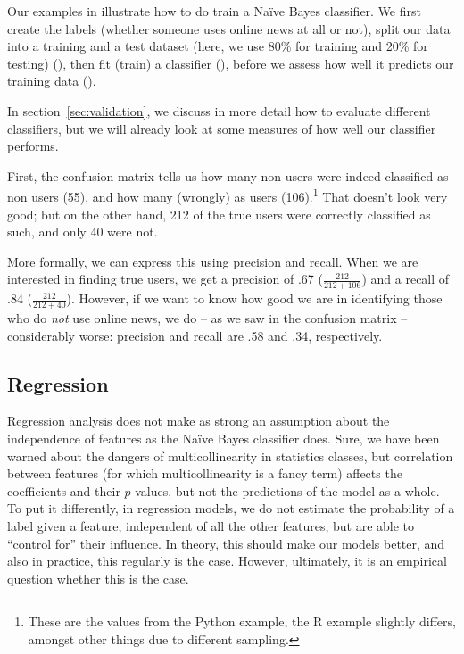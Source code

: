 Our examples in  illustrate how to do train a Na\"ive Bayes classifier.
We first create the labels (whether someone uses online news at all or
not), split our data into a training and a test dataset (here, we use
80\% for training and 20\% for testing) (), then
fit (train) a classifier (), before we assess how well it
predicts our training data ().

In section~\ref{sec:validation}, we discuss in more detail how to
evaluate different classifiers, but we will already look at some
measures of how well our classifier performs.

First, the confusion matrix tells us how many non-users were indeed
classified as non users (55), and how many (wrongly) as users
(106).\footnote{These are the values from the Python example, the R
  example slightly differs, amongst other things due to different
  sampling.} That doesn't look very good; but on the other hand, 212
of the true users were correctly classified as such, and only 40 were
not.

More formally, we can express this using precision and recall. When we
are interested in finding true users, we get a precision of .67
($\frac{212}{212+106}$) and a recall of .84 ($\frac{212}{212+40}$).
However, if we want to know how good we are in identifying those who
do \emph{not} use online news, we do -- as we saw in the confusion
matrix -- considerably worse: precision and recall are .58 and .34,
respectively.



\subsection{Regression}
Regression analysis does not make as strong an assumption about the
independence of features as the Na\"ive Bayes classifier does.  Sure,
we have been warned about the dangers of multicollinearity in
statistics classes, but correlation between features (for which
multicollinearity is a fancy term) affects the coefficients and their
$p$ values, but not the predictions of the model as a whole.  To put
it differently, in regression models, we do not estimate the
probability of a label given a feature, independent of all the other
features, but are able to ``control for'' their influence.  In theory,
this should make our models better, and also in practice, this
regularly is the case. However, ultimately, it is an empirical
question whether this is the case.

